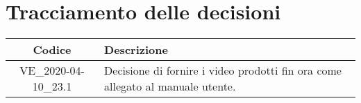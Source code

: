 \section*{Tracciamento delle decisioni}

\begin{center}
	\begin{longtable}{|c|p{12.25cm}|}
	\hline
	\rowcolor{lighter-grayer}
	\textbf{Codice} & \textbf{Descrizione} \\
	\hline
	\endfirsthead

	\hline
	VE\_2020-04-10\_23.1 & Decisione di fornire i video prodotti fin ora come allegato al manuale utente. \\
	\hline

	\end{longtable}
\end{center}
